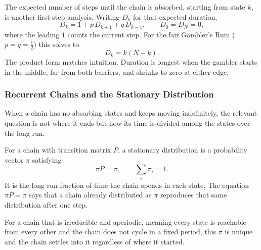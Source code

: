 \vspace{1em}

\begin{keybox}
The expected number of steps until the chain is absorbed, starting from state $k$, is another first-step analysis. Writing $D_k$ for that expected duration,
\[
D_k = 1 + p\, D_{k+1} + q\, D_{k-1}, \qquad D_0 = D_N = 0,
\]
where the leading $1$ counts the current step. For the fair Gambler's Ruin ($p = q = \tfrac{1}{2}$) this solves to
\[
D_k = k(N - k).
\]
The product form matches intuition. Duration is longest when the gambler starts in the middle, far from both barriers, and shrinks to zero at either edge.
\end{keybox}

\subsubsection{Recurrent Chains and the Stationary Distribution}

When a chain has no absorbing states and keeps moving indefinitely, the relevant question is not where it ends but how its time is divided among the states over the long run.

\begin{definition}
For a chain with transition matrix $P$, a stationary distribution is a probability vector $\pi$ satisfying
\[
\pi P = \pi, \qquad \sum_i \pi_i = 1.
\]
It is the long-run fraction of time the chain spends in each state. The equation $\pi P = \pi$ says that a chain already distributed as $\pi$ reproduces that same distribution after one step.
\end{definition}

For a chain that is irreducible and aperiodic, meaning every state is reachable from every other and the chain does not cycle in a fixed period, this $\pi$ is unique and the chain settles into it regardless of where it started.